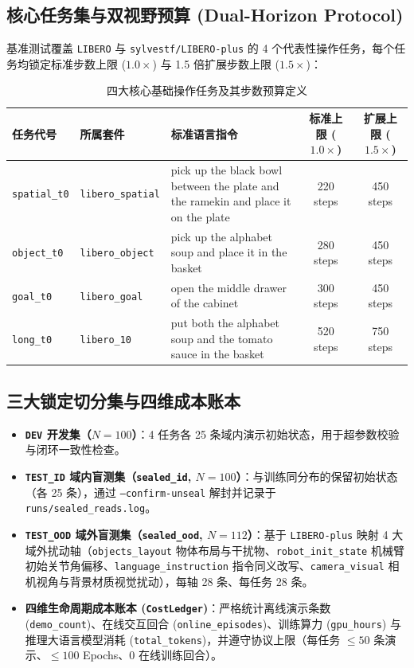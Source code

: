 \documentclass[11pt,a4paper]{article}
\begin{document}
\subsection{核心任务集与双视野预算 (Dual-Horizon Protocol)}

基准测试覆盖 \texttt{LIBERO} 与 \texttt{sylvestf/LIBERO-plus} 的 4 个代表性操作任务，每个任务均锁定标准步数上限 ($1.0\times$) 与 1.5 倍扩展步数上限 ($1.5\times$)：

\begin{table}[H]
\centering
\caption{四大核心基础操作任务及其步数预算定义}
\label{tab:tasks}
\small
\begin{tabular}{@{}llp{5.5cm}cc@{}}
\toprule
\textbf{任务代号} & \textbf{所属套件} & \textbf{标准语言指令} & \textbf{标准上限 ($1.0\times$)} & \textbf{扩展上限 ($1.5\times$)} \\
\midrule
\texttt{spatial\_t0} & \texttt{libero\_spatial} & pick up the black bowl between the plate and the ramekin and place it on the plate & 220 steps & 450 steps \\
\texttt{object\_t0} & \texttt{libero\_object} & pick up the alphabet soup and place it in the basket & 280 steps & 450 steps \\
\texttt{goal\_t0} & \texttt{libero\_goal} & open the middle drawer of the cabinet & 300 steps & 450 steps \\
\texttt{long\_t0} & \texttt{libero\_10} & put both the alphabet soup and the tomato sauce in the basket & 520 steps & 750 steps \\
\bottomrule
\end{tabular}
\end{table}

\subsection{三大锁定切分集与四维成本账本}

\begin{itemize}[leftmargin=1.5em,itemsep=2pt]
  \item \textbf{\texttt{DEV} 开发集（$N=100$）}：4 任务各 25 条域内演示初始状态，用于超参数校验与闭环一致性检查。
  \item \textbf{\texttt{TEST\_ID} 域内盲测集（\texttt{sealed\_id}, $N=100$）}：与训练同分布的保留初始状态（各 25 条），通过 \texttt{--confirm-unseal} 解封并记录于 \texttt{runs/sealed\_reads.log}。
  \item \textbf{\texttt{TEST\_OOD} 域外盲测集（\texttt{sealed\_ood}, $N=112$）}：基于 \texttt{LIBERO-plus} 映射 4 大域外扰动轴（\texttt{objects\_layout} 物体布局与干扰物、\texttt{robot\_init\_state} 机械臂初始关节角偏移、\texttt{language\_instruction} 指令同义改写、\texttt{camera\_visual} 相机视角与背景材质视觉扰动），每轴 28 条、每任务 28 条。
  \item \textbf{四维生命周期成本账本 (\texttt{CostLedger})}：严格统计离线演示条数 (\texttt{demo\_count})、在线交互回合 (\texttt{online\_episodes})、训练算力 (\texttt{gpu\_hours}) 与推理大语言模型消耗 (\texttt{total\_tokens})，并遵守协议上限（每任务 $\le 50$ 条演示、$\le 100$ Epochs、0 在线训练回合）。
\end{itemize}
\end{document}
